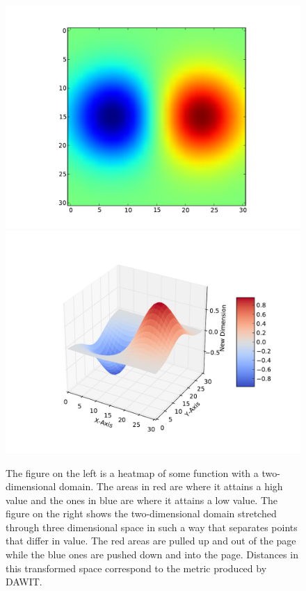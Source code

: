 \begin{figure}[!htb]
    \includegraphics[width=\linewidth]{../writeup/figs/bumps.pdf}
  \endminipage\hfill
    \includegraphics[width=\linewidth]{../writeup/figs/tfbumps.pdf}
  \endminipage
   \label{dimad}
\caption[Dimension-Adding WIT example]
{The figure on the left is a heatmap of some function with a two-dimensional
domain.
The areas in red are where it attains a high value and the ones in blue
are where it attains a low value.
The figure on the right shows the two-dimensional domain stretched through three
dimensional space in such a way that separates points that differ in value.
The red areas are pulled up and out of the page while the blue ones are pushed
down and into the page.
Distances in this transformed space correspond to the metric produced by DAWIT.}
\end{figure}

